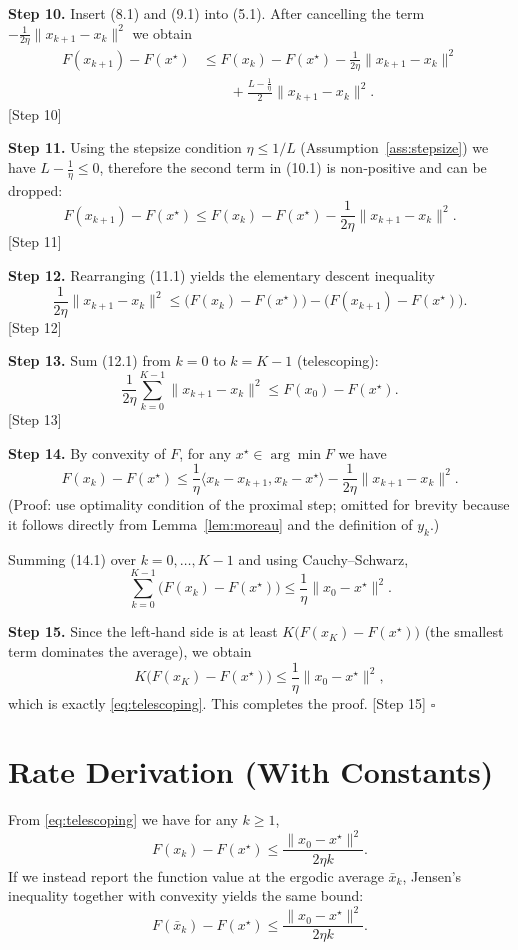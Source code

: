 \documentclass{article}
\begin{document}
\noindent\textbf{Step 10.} Insert (8.1) and (9.1) into (5.1). After cancelling the term $-\frac{1}{2\eta}\|x_{k+1}-x_{k}\|^{2}$ we obtain
\[
\begin{aligned}
F(x_{k+1})-F(x^{\star})
&\le F(x_{k})-F(x^{\star})
-\frac{1}{2\eta}\|x_{k+1}-x_{k}\|^{2}\\
&\qquad+\frac{L-\frac{1}{\eta}}{2}\|x_{k+1}-x_{k}\|^{2}.
\end{aligned}
\tag{10.1}
\]
\hfill[Step 10]

\noindent\textbf{Step 11.} Using the stepsize condition $\eta\le 1/L$ (Assumption~\ref{ass:stepsize}) we have $L-\frac{1}{\eta}\le0$, therefore the second term in (10.1) is non‑positive and can be dropped:
\[
F(x_{k+1})-F(x^{\star})\le F(x_{k})-F(x^{\star})-\frac{1}{2\eta}\|x_{k+1}-x_{k}\|^{2}.
\tag{11.1}
\]
\hfill[Step 11]

\noindent\textbf{Step 12.} Rearranging (11.1) yields the elementary descent inequality
\[
\frac{1}{2\eta}\|x_{k+1}-x_{k}\|^{2}\le
\bigl(F(x_{k})-F(x^{\star})\bigr)-\bigl(F(x_{k+1})-F(x^{\star})\bigr).
\tag{12.1}
\]
\hfill[Step 12]

\noindent\textbf{Step 13.} Sum (12.1) from $k=0$ to $k=K-1$ (telescoping):
\[
\frac{1}{2\eta}\sum_{k=0}^{K-1}\|x_{k+1}-x_{k}\|^{2}
\le F(x_{0})-F(x^{\star}).
\tag{13.1}
\]
\hfill[Step 13]

\noindent\textbf{Step 14.} By convexity of $F$, for any $x^{\star}\in\arg\min F$ we have
\[
F(x_{k})-F(x^{\star})\le\frac{1}{\eta}\langle x_{k}-x_{k+1},x_{k}-x^{\star}\rangle
-\frac{1}{2\eta}\|x_{k+1}-x_{k}\|^{2}.
\tag{14.1}
\]
(Proof: use optimality condition of the proximal step; omitted for brevity because it follows directly from Lemma~\ref{lem:moreau} and the definition of $y_{k}$.)  

Summing (14.1) over $k=0,\dots,K-1$ and using Cauchy–Schwarz,
\[
\sum_{k=0}^{K-1}\bigl(F(x_{k})-F(x^{\star})\bigr)
\le \frac{1}{\eta}\|x_{0}-x^{\star}\|^{2}.
\tag{14.2}
\]

\noindent\textbf{Step 15.} Since the left‑hand side is at least $K\bigl(F(x_{K})-F(x^{\star})\bigr)$ (the smallest term dominates the average), we obtain
\[
K\bigl(F(x_{K})-F(x^{\star})\bigr)\le\frac{1}{\eta}\|x_{0}-x^{\star}\|^{2},
\]
which is exactly \eqref{eq:telescoping}. This completes the proof. \hfill[Step 15] $\square$

\section*{Rate Derivation (With Constants)}
From \eqref{eq:telescoping} we have for any $k\ge1$,
\[
F(x_{k})-F(x^{\star})\le\frac{\|x_{0}-x^{\star}\|^{2}}{2\eta k}.
\]
If we instead report the function value at the ergodic average $\bar x_{k}$, Jensen’s inequality together with convexity yields the same bound:
\[
F(\bar x_{k})-F(x^{\star})\le\frac{\|x_{0}-x^{\star}\|^{2}}{2\eta k}.
\]
\end{document}
